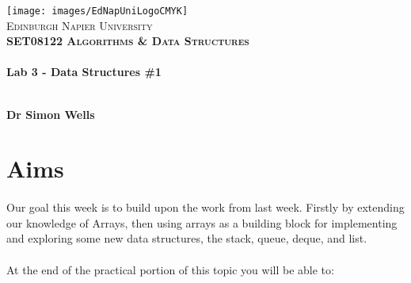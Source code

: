 \documentclass[10pt, a4paper, twosize]{article}
\begin{document}

\begin{titlepage}
\vspace*{5cm}
\begin{center}
\texttt{[image: images/EdNapUniLogoCMYK]}~\\[1cm]

\textsc{\Large Edinburgh Napier University}\\[1.5cm]

\textsc{\LARGE \bfseries SET08122 Algorithms \& Data Structures}\\[0.5cm]

\hrulefill \\[0.4cm]
{\huge \bfseries Lab 3 - Data Structures \#1 \\[0.4cm] }
\hrulefill \\[1.5cm]

\begin{minipage}{0.4\textwidth}
\begin{flushleft} \large
\textbf{Dr Simon Wells} \\
\end{flushleft}
\end{minipage}

\vfill

\end{center}
\end{titlepage}




%

\section{Aims}
\paragraph{} Our goal this week is to build upon the work from last week. Firstly by extending our knowledge of Arrays, then using arrays as a building block for implementing and exploring some new data structures, the stack, queue, deque, and list.

\paragraph{} At the end of the practical portion of this topic you will be able to:
\end{document}
